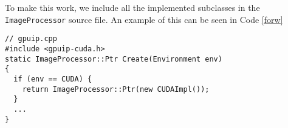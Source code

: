 To make this work, we include all the implemented subclasses in the {\tt ImageProcessor} source file. An example of this can be seen in Code \ref{forw}
\newline
\begin{lstlisting}[caption= {\tt ImageProcessor::Create} spawns instances of subclasses to itself, label=ipapi]
// gpuip.cpp
#include <gpuip-cuda.h> 
static ImageProcessor::Ptr Create(Environment env)
{
  if (env == CUDA) {
    return ImageProcessor::Ptr(new CUDAImpl());
  }
  ...
}
\end{lstlisting}


